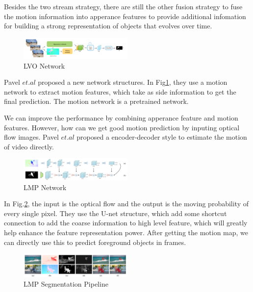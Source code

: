 Besides the two stream strategy, there are still the other fusion strategy to fuse the motion information into apperance 
features to provide additional infomation for building a strong representation of objects that evolves over time. 

\begin{figure}[ht]
    \centering
    \includegraphics[width=0.5\textwidth]{./figure/LVO_NET.png}
    \caption{LVO Network}
    \label{LVO}
\end{figure}

Pavel $et.al$\cite{Tokmakov2017Learning} proposed a new network structures. In Fig\ref{LVO}, they use a motion network to extract motion features, which 
take as side information to get the final prediction. The motion network is a pretrained network.

We can improve the performance by combining apperance feature and motion features. However, how can we get good motion
prediction by inputing optical flow images. Pavel $et.al$\cite{LMPV} proposed a encoder-decoder style to estimate the motion 
of video directly.

\begin{figure}[ht]
    \centering
    \includegraphics[width=0.5\textwidth]{./figure/LMP_NET.png}
    \caption{LMP Network}
    \label{LMP}
\end{figure}

In Fig.\ref{LMP}, the input is the optical flow and the output is the moving probability of every single pixel. They use the U-net structure, which
add some shortcut connection to add the coarse information to high level feature, which will greatly help enhance the feature representation power.
After getting the motion map, we can directly use this to predict foreground objects in frames. 

\begin{figure}[ht]
    \centering
    \includegraphics[width=0.5\textwidth]{./figure/LMP_results.png}
    \caption{LMP Segmentation Pipeline}
    \label{LMP_results}
\end{figure}

